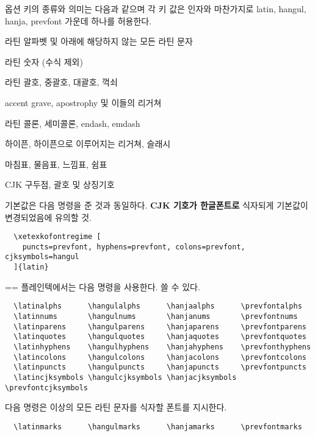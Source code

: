\documentclass[a4paper]{article}
\def\grayvrule{{\color{white!80!black}\vrule width 2pt}}
\newenvironment{plaintex}
  {\setbox0=\vbox\bgroup\hsize=\dimexpr\textwidth-12pt\relax\medbreak\small}
  {\medbreak\egroup \par\medskip
    \ifdim\ht0<\dimexpr\pagegoal-\pagetotal\relax
      \hbox{\grayvrule\kern10pt\box0}%
    \else
      \setbox2=\vsplit0 to\dimexpr\pagegoal-\pagetotal\relax
      \lineskip=0pt
      \ifvoid2 \else\hbox{\grayvrule\kern10pt\box2}\fi
      \ifvoid0 \else\hbox{\grayvrule\kern10pt\box0}\fi
    \fi \par\medskip }
\def\hemph#1{\textsf{\bfseries #1}}
\def\hparen#1{{\small\hangulparens(#1)}}
\begin{document}
옵션 키의 종류와 의미는 다음과 같으며 각 키 값은 인자와 마찬가지로
latin, hangul, hanja, prevfont 가운데 하나를 허용한다.
\begin{description}\itemsep0pt\hangulparens
\item[alphs] 라틴 알파벳 및 아래에 해당하지 않는 모든 라틴 문자
\item[nums] 라틴 숫자 \hparen{수식 제외}
\item[parens] 라틴 괄호, 중괄호, 대괄호, 꺽쇠
\item[quotes] accent grave, apostrophy 및 이들의 리거쳐
\item[colons] 라틴 콜론, 세미콜론, endash, emdash
\item[hyphens] 하이픈, 하이픈으로 이루어지는 리거쳐, 슬래시
\item[puncts] 마침표, 물음표, 느낌표, 쉼표
\item[cjksymbols] CJK 구두점, 괄호 및 상징기호
\end{description}

기본값은 다음 명령을 준 것과 동일하다. \hemph{CJK 기호가 한글폰트로}
식자되게 기본값이 변경되었음에 유의할 것.
\begin{verbatim}
  \xetexkofontregime [
    puncts=prevfont, hyphens=prevfont, colons=prevfont, cjksymbols=hangul
  ]{latin}
\end{verbatim}

\begin{plaintex}
플레인텍에서는 다음 명령을 사용한다.  쓸 수 있다.
\begin{verbatim}
  \latinalphs      \hangulalphs      \hanjaalphs      \prevfontalphs
  \latinnums       \hangulnums       \hanjanums       \prevfontnums
  \latinparens     \hangulparens     \hanjaparens     \prevfontparens
  \latinquotes     \hangulquotes     \hanjaquotes     \prevfontquotes
  \latinhyphens    \hangulhyphens    \hanjahyphens    \prevfonthyphens
  \latincolons     \hangulcolons     \hanjacolons     \prevfontcolons
  \latinpuncts     \hangulpuncts     \hanjapuncts     \prevfontpuncts
  \latincjksymbols \hangulcjksymbols \hanjacjksymbols \prevfontcjksymbols
\end{verbatim}
다음 명령은 이상의 모든 라틴 문자를 식자할 폰트를 지시한다.
\begin{verbatim}
  \latinmarks      \hangulmarks      \hanjamarks      \prevfontmarks
\end{verbatim}
\end{plaintex}
\end{document}

